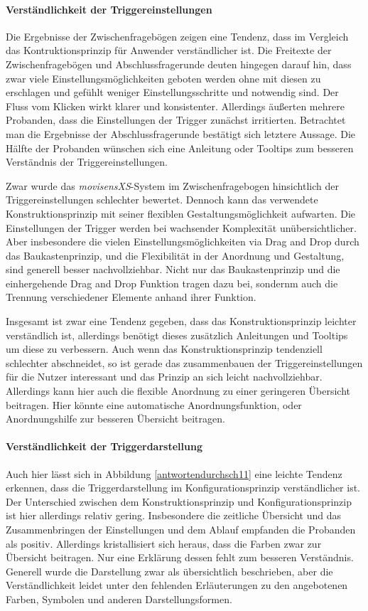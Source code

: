 \paragraph{Verständlichkeit der Triggereinstellungen}
Die Ergebnisse der Zwischenfragebögen zeigen eine Tendenz, dass im Vergleich das Kontruktionsprinzip für Anwender verständlicher ist. Die Freitexte der Zwischenfragebögen und Abschlussfragerunde deuten hingegen darauf hin, dass zwar viele Einstellungsmöglichkeiten geboten werden ohne mit diesen zu erschlagen und gefühlt weniger Einstellungsschritte und notwendig sind. Der Fluss vom Klicken wirkt klarer und konsistenter. Allerdings äußerten mehrere Probanden, dass die Einstellungen der Trigger zunächst irritierten. Betrachtet man die Ergebnisse der Abschlussfragerunde bestätigt sich letztere Aussage. Die Hälfte der Probanden wünschen sich eine Anleitung oder Tooltips zum besseren Verständnis der Triggereinstellungen.

Zwar wurde das \emph{movisensXS}-System im Zwischenfragebogen hinsichtlich der Triggereinstellungen schlechter bewertet. Dennoch kann das verwendete Konstruktionsprinzip mit seiner flexiblen Gestaltungsmöglichkeit aufwarten. Die Einstellungen der Trigger werden bei wachsender Komplexität unübersichtlicher. Aber insbesondere die vielen Einstellungsmöglichkeiten via Drag and Drop durch das Baukastenprinzip, und die Flexibilität in der Anordnung und Gestaltung, sind generell besser nachvollziehbar. Nicht nur das Baukastenprinzip und die einhergehende Drag and Drop Funktion tragen dazu bei, sondernm auch die Trennung verschiedener Elemente anhand ihrer Funktion. 

Insgesamt ist zwar eine Tendenz gegeben, dass das Konstruktionsprinzip leichter verständlich ist, allerdings benötigt dieses zusätzlich Anleitungen und Tooltips um diese zu verbessern. Auch wenn das Konstruktionsprinzip tendenziell schlechter abschneidet, so ist gerade das zusammenbauen der Triggereinstellungen für die Nutzer interessant und das Prinzip an sich leicht nachvollziehbar. Allerdings kann hier auch die flexible Anordnung zu einer geringeren Übersicht beitragen. Hier könnte eine automatische Anordnungsfunktion, oder Anordnungshilfe zur besseren Übersicht beitragen.


\paragraph{Verständlichkeit der Triggerdarstellung}
Auch hier lässt sich in Abbildung \ref{antwortendurchsch11} eine leichte Tendenz erkennen, dass die Triggerdarstellung im Konfigurationsprinzip verständlicher ist. Der Unterschied zwischen dem Konstruktionsprinzip und Konfigurationsprinzip ist hier allerdings relativ gering. Insbesondere die zeitliche Übersicht und das Zusammenbringen der Einstellungen und dem Ablauf empfanden die Probanden als positiv. Allerdings kristallisiert sich heraus, dass die Farben zwar zur Übersicht beitragen. Nur eine Erklärung dessen fehlt zum besseren Verständnis. Generell wurde die Darstellung zwar als übersichtlich beschrieben, aber die Verständlichkeit leidet unter den fehlenden Erläuterungen zu den angebotenen Farben, Symbolen und anderen Darstellungsformen. 

